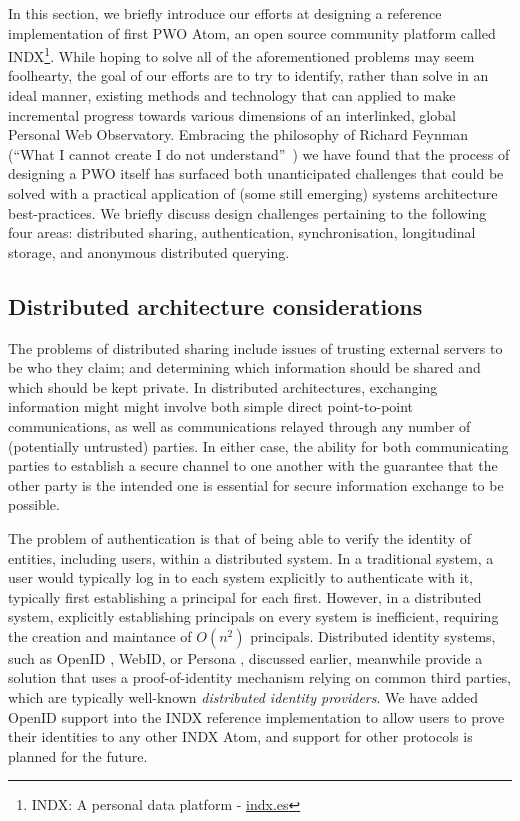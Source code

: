 \documentclass{acm_proc_article-sp}
\begin{document}
In this section, we briefly introduce our efforts at designing a reference implementation of first PWO Atom, an open source community platform called INDX\footnote{INDX: A personal data platform - \url{indx.es}}.  While hoping to solve all of the aforementioned problems may seem foolhearty, the goal of our efforts are to try to identify, rather than solve in an ideal manner, existing methods and technology that can applied to  make incremental progress towards various dimensions of an interlinked, global Personal Web Observatory.  Embracing the philosophy of Richard Feynman (``What I cannot create I do not understand''~\cite{feynman1982simulating}) we have found that the process of designing a PWO itself has surfaced both unanticipated challenges that could be solved with a practical application of (some still emerging) systems architecture best-practices.  We briefly discuss design challenges pertaining to the following four areas: distributed sharing, authentication, synchronisation, longitudinal storage, and anonymous distributed querying.

\subsection{Distributed architecture considerations}

The problems of distributed sharing include issues of trusting external servers to be who they claim; and determining which information should be shared and which should be kept private.  In distributed architectures, exchanging information might  might involve both simple direct point-to-point communications, as well as communications relayed through any number of (potentially untrusted) parties.  In either case, the ability for both communicating parties to establish a secure channel to one another with the guarantee that the other party is the intended one is essential for secure information exchange to be possible.

The problem of authentication is that of being able to verify the identity of entities, including users, within a distributed system. In a traditional system, a user would typically log in to each system explicitly to authenticate with it, typically first establishing a principal for each first.  However, in a distributed system, explicitly establishing principals on every system is inefficient, requiring the creation and maintance of $O(n^2)$ principals.  Distributed identity systems, such as OpenID \cite{recordon2006openid}, WebID\cite{huang2000webid}, or Persona \cite{koshutanski2007distributed}, discussed earlier, meanwhile provide a solution that uses a proof-of-identity mechanism relying on common third parties, which are typically well-known  \emph{distributed identity providers}. We have added OpenID support into the INDX reference implementation to allow users to prove their identities to any other INDX Atom, and support for other protocols is planned for the future.
\end{document}

